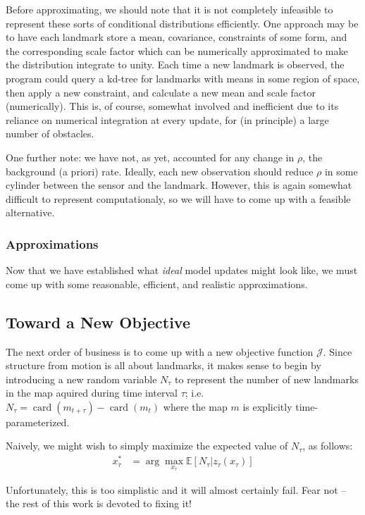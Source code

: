 \documentclass[12pt]{article}
\DeclareMathOperator{\card}{card}
\begin{document}
Before approximating, we should note that it is not completely infeasible to represent these sorts of conditional distributions efficiently. One approach may be to have each landmark store a mean, covariance, constraints of some form, and the corresponding scale factor which can be numerically approximated to make the distribution integrate to unity. Each time a new landmark is observed, the program could query a kd-tree for landmarks with means in some region of space, then apply a new constraint, and calculate a new mean and scale factor (numerically). This is, of course, somewhat involved and inefficient due to its reliance on numerical integration at every update, for (in principle) a large number of obstacles.

One further note: we have not, as yet, accounted for any change in $\rho$, the background (a priori) rate. Ideally, each new observation should reduce $\rho$ in some cylinder between the sensor and the landmark. However, this is again somewhat difficult to represent computationaly, so we will have to come up with a feasible alternative.

\subsubsection{Approximations}

Now that we have established what \textit{ideal} model updates might look like, we must come up with some reasonable, efficient, and realistic approximations.

\subsection{Toward a New Objective}

The next order of business is to come up with a new objective function $\mathcal{J}$. Since structure from motion is all about landmarks, it makes sense to begin by introducing a new random variable $N_{\tau}$ to represent the number of new landmarks in the map aquired during time interval $\tau$; i.e. $N_{\tau} = \card(m_{t + \tau}) - \card(m_t)$ where the map $m$ is explicitly time-parameterized.

Naively, we might wish to simply maximize the expected value of $N_{\tau}$, as follows:
\begin{align}
  x_{\tau}^* &= \arg \max_{x_{\tau}} \mathbb{E}[N_{\tau} | z_{\tau}(x_{\tau})]
\end{align}

Unfortunately, this is too simplistic and it will almost certainly fail. Fear not -- the rest of this work is devoted to fixing it!
\end{document}
